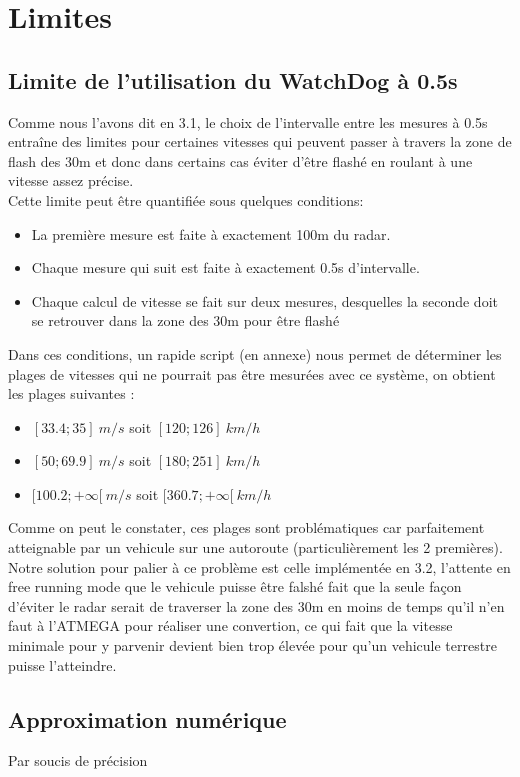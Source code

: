 \documentclass[a4paper, 12pt]{article}
\begin{document}
		\section{Limites}
		\subsection{Limite de l'utilisation du WatchDog à 0.5s}
		Comme nous l'avons dit en 3.1, le choix de l'intervalle entre les mesures à 0.5s entraîne des limites pour certaines vitesses qui peuvent passer à travers la zone de flash des 30m et donc dans certains cas éviter d'être flashé en roulant à une vitesse assez précise.\\
		Cette limite peut être quantifiée sous quelques conditions:
		\begin{itemize}
			\item La première mesure est faite à exactement 100m du radar.
			\item Chaque mesure qui suit est faite à exactement 0.5s d'intervalle.
			\item Chaque calcul de vitesse se fait sur deux mesures, desquelles la seconde doit se retrouver dans la zone des 30m pour être flashé
		\end{itemize}
		Dans ces conditions, un rapide script (en annexe) nous permet de déterminer les plages de vitesses qui ne pourrait pas être mesurées avec ce système, on obtient les plages suivantes :
		\begin{itemize}
			\item $[33.4;35]\ m/s$ soit $[120;126]\ km/h$
			\item $[50;69.9]\ m/s$ soit $[180;251]\ km/h$
			\item $[100.2;+\infty[\ m/s$ soit $[360.7;+\infty[\ km/h$
		\end{itemize}
		Comme on peut le constater, ces plages sont problématiques car parfaitement atteignable par un vehicule sur une autoroute (particulièrement les 2 premières). Notre solution pour palier à ce problème est celle implémentée en 3.2, l'attente en free running mode que le vehicule puisse être falshé fait que la seule façon d'éviter le radar serait de traverser la zone des 30m en moins de temps qu'il n'en faut à l'ATMEGA pour réaliser une convertion, ce qui fait que la vitesse minimale pour y parvenir devient bien trop élevée pour qu'un vehicule terrestre puisse l'atteindre.
	
		\subsection{Approximation numérique}
		Par soucis de précision 
		
\end{document}
